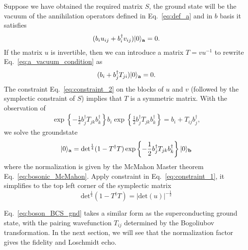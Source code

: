 Suppose we have obtained the required matrix $S$, the ground state will be the vacuum of the annihilation operators defined in Eq.~\eqref{eq:def_a} and in $b$ basis it satisfies
\begin{equation}\begin{aligned}
\label{eq:a_vacuum_condition}
(b_iu_{ij}+b_i^\dagger v_{ij})|0\rangle_{{\bf a}}=0.
\end{aligned}\end{equation}
If the matrix $u$ is invertible, then we can introduce a matrix $T=vu^{-1}$ to rewrite Eq.~\eqref{eq:a_vacuum_condition} as
\begin{equation}\begin{aligned}
(b_i+b_j^\dagger T_{ji})|0\rangle_{{\bf a}}=0. 
\end{aligned}\end{equation}
The constraint Eq.~\eqref{eq:constraint_2} on the blocks of $u$ and $v$ (followed by the symplectic constraint of $S$) implies that $T$ is a symmetric matrix. With the observation of 
\begin{equation}\begin{aligned}
\exp\left\{-\frac{1}{2}b_j^\dagger T_{jk}b_k^\dagger\right\}b_i\exp\left\{\frac{1}{2}b_j^\dagger T_{jk}b_k^\dagger\right\}=b_i+T_{ij}b^\dagger_j,
\end{aligned}\end{equation}
we solve the groundstate
\begin{equation}\begin{aligned}
\label{eq:boson_BCS_gnd}
|0\rangle_{{\bf a}}&=\text{det}^{\frac{1}{4}}(1-T^\dagger T)\exp\left\{-\frac{1}{2}b_j^\dagger T_{jk}b_k^\dagger\right\}|0\rangle_{\bf b}\\
\end{aligned}\end{equation}
where the normalization is given by the McMahon Master theorem Eq.~\ref{eq:bosonic_McMahon}. Apply constraint in Eq.~\eqref{eq:constraint_1}, it simplifies to the top left corner of the symplectic matrix
\begin{equation}
\text{det}^{\frac{1}{4}}(1-T^\dagger T) =|\text{det}(u)|^{-\frac{1}{2}}
\end{equation}

Eq.~\eqref{eq:boson_BCS_gnd} takes a similar form as the superconducting ground state, with the pairing wavefunction $T_{ij}$ determined by the Bogoliubov transformation. In the next section, we will see that the normalization factor gives the fidelity and Loschmidt echo.

